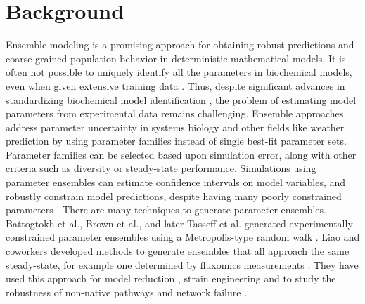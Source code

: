 \documentclass{bmcart}
\begin{document}



\section*{Background}
Ensemble modeling is a promising approach for obtaining robust predictions and coarse grained population behavior in deterministic mathematical models.
It is often not possible to uniquely identify all the parameters in biochemical models, even when given extensive training data \cite{Gadkar:2005ad}.
Thus, despite significant advances in standardizing biochemical model identification \cite{Gennemark:2009on},
the problem of estimating model parameters from experimental data remains challenging.
Ensemble approaches address parameter uncertainty in systems biology and other fields like weather prediction \cite{Battogtokh:2002,Kuepfer:2007aa, Brown:2003,Palmer:2005}
by using parameter families instead of single best-fit parameter sets.
Parameter families can be selected based upon simulation error, along with other criteria such as diversity or steady-state performance.
Simulations using parameter ensembles can estimate confidence intervals on model variables, and robustly constrain model predictions,
despite having many poorly constrained parameters \cite{Gutenkunst2007,Song:2009b}.
There are many techniques to generate parameter ensembles.
Battogtokh et al., Brown et al., and later Tasseff et al. generated experimentally constrained parameter ensembles using a
Metropolis-type random walk \cite{Battogtokh:2002,Brown:2003,Tasseff:2010aa,Tasseff:2011aa}.
Liao and coworkers developed methods to generate ensembles that all approach the same steady-state, for example one determined by fluxomics measurements \cite{Tran:2008aa}.
They have used this approach for model reduction \cite{Tan:2011aa}, strain engineering \cite{Contador2009221,Tan:2012aa} and to study the robustness of non-native pathways and network failure \cite{Lee:2014aa}.
\end{document}
